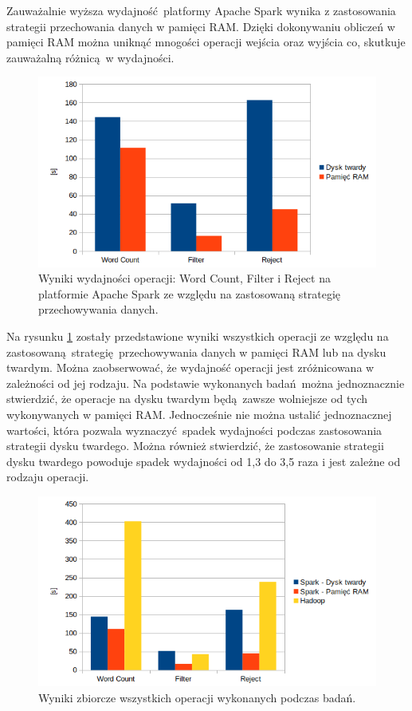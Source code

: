 Zauważalnie wyższa wydajność platformy Apache Spark wynika z zastosowania strategii przechowania danych w pamięci RAM. Dzięki dokonywaniu obliczeń w pamięci RAM można uniknąć mnogości operacji wejścia oraz wyjścia co, skutkuje zauważalną różnicą w wydajności.
\begin{figure}[!htb]
	\centering
	\includegraphics[scale=0.6]{results-spark-strategy-comparison-bar.png}
	\caption{Wyniki wydajności operacji: Word Count, Filter i Reject na platformie Apache Spark ze względu na zastosowaną strategię przechowywania danych.}
	\label{fig:results-spark-strategy-comparison-bar}
\end{figure}
Na rysunku \ref{fig:results-spark-strategy-comparison-bar} zostały przedstawione wyniki wszystkich operacji ze względu na zastosowaną strategię przechowywania danych w pamięci RAM lub na dysku twardym. Można zaobserwować, że wydajność operacji jest zróżnicowana w zależności od jej rodzaju. Na podstawie wykonanych badań można jednoznacznie stwierdzić, że operacje na dysku twardym będą zawsze wolniejsze od tych wykonywanych w pamięci RAM. Jednocześnie nie można ustalić jednoznacznej wartości, która pozwala wyznaczyć spadek wydajności podczas zastosowania strategii dysku twardego. Można również stwierdzić, że zastosowanie strategii dysku twardego powoduje spadek wydajności od 1,3 do 3,5 raza i jest zależne od rodzaju operacji. 
\begin{figure}[!htb]
	\centering
	\includegraphics[scale=0.6]{results-comparison-bar-all.png}
	\caption{Wyniki zbiorcze wszystkich operacji wykonanych podczas badań.}
	\label{fig:results-comparison-bar-all}
\end{figure}
